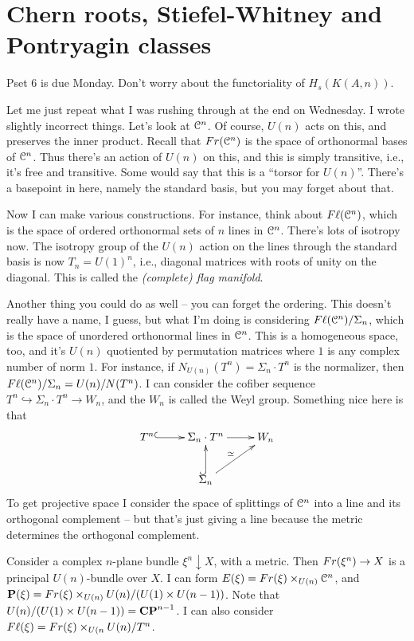 \section{Chern roots, Stiefel-Whitney and Pontryagin classes}
Pset 6 is due Monday.
Don't worry about the functoriality of $H_s(K(A,n))$.

Let me just repeat what I was rushing through at the end on Wednesday.
I wrote slightly incorrect things.
Let's look at $\mathcal C^n$.
Of course, $U(n)$ acts on this, and preserves the inner product.
Recall that $Fr(\mathcal C^n)$ is the space of orthonormal bases of $\mathcal C^n$.
Thus there's an action of $U(n)$ on this, and this is simply transitive, i.e., it's free and transitive.
Some would say that this is a ``torsor for $U(n)$''.
There's a basepoint in here, namely the standard basis, but you may forget about that.

Now I can make various constructions.
For instance, think about $F\ell(\mathcal C^n)$, which is the space of ordered orthonormal sets of $n$ lines in $\mathcal C^n$.
There's lots of isotropy now.
The isotropy group of the $U(n)$ action on the lines through the standard basis is now $T_n=U(1)^n$, i.e., diagonal matrices with roots of unity on the diagonal.
This is called the \emph{(complete) flag manifold}.

Another thing you could do as well -- you can forget the ordering.
This doesn't really have a name, I guess, but what I'm doing is considering $F\ell(\mathcal C^n)/\Sigma_n$, which is the space of unordered orthonormal lines in $\mathcal C^n$.
This is a homogeneous space, too, and it's $U(n)$ quotiented by permutation matrices where $1$ is any complex number of norm $1$.
For instance, if $N_{U(n)}(T^n) = \Sigma_n\cdot T^n$ is the normalizer, then $F\ell(\mathcal C^n)/\Sigma_n = U(n)/N(T^n)$.
I can consider the cofiber sequence $T^n\hookrightarrow \Sigma_n\cdot T^n \to W_n$, and the $W_n$ is called the Weyl group.
Something nice here is that
\begin{equation*}
    \xymatrix{
	T^n\ar@{^(->}[r] & \Sigma_n\cdot T^n\ar[r] & W_n\\
	& \Sigma_n\ar@{^(->}[u]\ar[ur]^\simeq & 
    }
\end{equation*}
To get projective space I consider the space of splittings of $\mathcal C^n$ into a line and its orthogonal complement -- but that's just giving a line because the metric determines the orthogonal complement.

Consider a complex $n$-plane bundle $\xi^n\downarrow X$, with a metric.
Then $Fr(\xi^n)\to X$ is a principal $U(n)$-bundle over $X$.
I can form $E(\xi) = Fr(\xi)\times_{U(n)}\mathcal C^n$, and $\mathbf P(\xi) = Fr(\xi)\times_{U(n)} U(n)/(U(1)\times U(n-1))$.
Note that $U(n)/(U(1)\times U(n-1)) = \mathbf{CP}^{n-1}$.
I can also consider $F\ell(\xi) = Fr(\xi)\times_{U(n} U(n)/T^n$.


